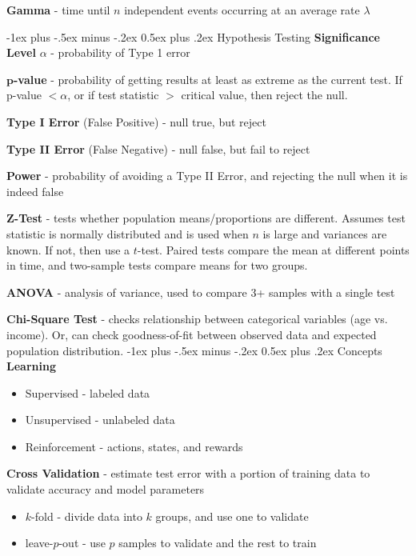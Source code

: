 \documentclass[10pt,landscape]{article}
\makeatletter
\renewcommand{\section}{\@startsection{section}{1}{0mm}%
                                {-1ex plus -.5ex minus -.2ex}%
                                {0.5ex plus .2ex}%
                                {\normalfont\large\bfseries}}
\renewcommand{\subsection}{\@startsection{subsection}{2}{0mm}%
                                {-1ex plus -.5ex minus -.2ex}%
                                {0.5ex plus .2ex}%
                                {\normalfont\normalsize\bfseries}}
\makeatother
\begin{document}
\begin{multicols}{3}
\textbf{Gamma} - time until $n$ independent events occurring at an average rate $\lambda$ 

\subsection{Hypothesis Testing}
\textbf{Significance Level} $\alpha$ - probability of Type 1 error 

$\boldsymbol p$\textbf{-value} - probability of getting results at least as extreme as the current test. If p-value $<\alpha$, or if test statistic $>$ critical value, then reject the null.

\textbf{Type I Error} (False Positive) - null true, but reject  

\textbf{Type II  Error} (False Negative)  - null false, but fail to reject

\textbf{Power} - probability of avoiding a Type II Error, and rejecting the null when it is indeed false

\textbf{Z-Test} - tests whether population means/proportions are different. Assumes test statistic is normally distributed and is used when $n$ is large and variances are known. If not, then use a $t$-test. Paired tests compare the mean at different points in time, and two-sample tests compare means for two groups.

\textbf{ANOVA} - analysis of variance, used to compare 3+ samples with a single test

\textbf{Chi-Square Test} - checks relationship between categorical variables (age vs. income). Or, can check goodness-of-fit between observed data and expected population distribution. 
\section{Concepts}
\textbf{Learning}

\begin{itemize}[label={--},leftmargin=4mm]
\itemsep -.4mm 
\vspace{-1.5mm}
\item Supervised - labeled data
\item Unsupervised - unlabeled data
\item Reinforcement - actions, states, and rewards 
\end{itemize}


\textbf{Cross Validation} - estimate test error with a portion of training data to validate accuracy and model parameters
\begin{itemize}[label={--},leftmargin=4mm]
\itemsep -.4mm 
\vspace{-1mm}
\item $k$-fold - divide data into $k$ groups, and use one to validate
\item leave-$p$-out  - use $p$ samples to validate and the rest to train
\end{itemize}


\end{multicols}
\end{document}

